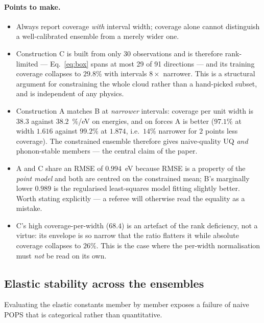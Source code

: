 \documentclass{article}
\begin{document}
\paragraph{Points to make.}
\begin{itemize}
  \item Always report coverage \emph{with} interval width; coverage alone cannot distinguish a well-calibrated ensemble from a merely wider one.
  \item Construction C is built from only 30 observations and is therefore rank-limited --- Eq.~\eqref{eq:box} spans at most 29 of 91 directions --- and its training coverage collapses to $29.8\%$ with intervals $8\times$ narrower. This is a structural argument for constraining the whole cloud rather than a hand-picked subset, and is independent of any physics.
  \item Construction A matches B at \emph{narrower} intervals: coverage per unit width is $38.3$ against $38.2$~\%/eV on energies, and on forces A is better ($97.1\%$ at width $1.616$ against $99.2\%$ at $1.874$, i.e.\ $14\%$ narrower for $2$ points less coverage). The constrained ensemble therefore gives naive-quality UQ \emph{and} phonon-stable members --- the central claim of the paper.
  \item A and C share an RMSE of $0.994$~eV because RMSE is a property of the \emph{point model} and both are centred on the constrained mean; B's marginally lower $0.989$ is the regularised least-squares model fitting slightly better. Worth stating explicitly --- a referee will otherwise read the equality as a mistake.
  \item C's high coverage-per-width ($68.4$) is an artefact of the rank deficiency, not a virtue: its envelope is so narrow that the ratio flatters it while absolute coverage collapses to $26\%$. This is the case where the per-width normalisation must \emph{not} be read on its own.
\end{itemize}

\subsection{Elastic stability across the ensembles}
\label{sec:elastic stability}

Evaluating the elastic constants member by member exposes a failure of naive POPS
that is categorical rather than quantitative.
\end{document}
